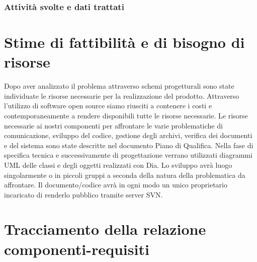\documentclass[11pt,titlepage,a4paper]{report}
\begin{document}
\subsection{Attivit\`a svolte e dati trattati}


\chapter{Stime di fattibilit\`a e di bisogno di risorse}
Dopo aver analizzato il problema attraverso schemi progetturali sono state individuate le risorse necessarie  per la realizzazione del prodotto. Attraverso l'utilizzo di software open source siamo riusciti a contenere i costi e contemporaneamente a rendere disponibili tutte le risorse necessarie.
Le risorse necessarie ai nostri componenti per affrontare le varie problematiche di comunicazione, sviluppo del codice, gestione degli archivi, verifica dei documenti e del sistema sono state descritte nel documento Piano di Qualifica. Nella fase di specifica tecnica e successivamente di progettazione verrano utilizzati diagrammi UML delle classi e degli oggetti realizzati con Dia. Lo sviluppo avr\`a luogo singolarmente o in piccoli gruppi a seconda della natura della problematica da affrontare. Il documento/codice avr\`a in ogni modo un unico proprietario incaricato di renderlo pubblico tramite server SVN.
\chapter{Tracciamento della relazione componenti-requisiti}
\end{document}

